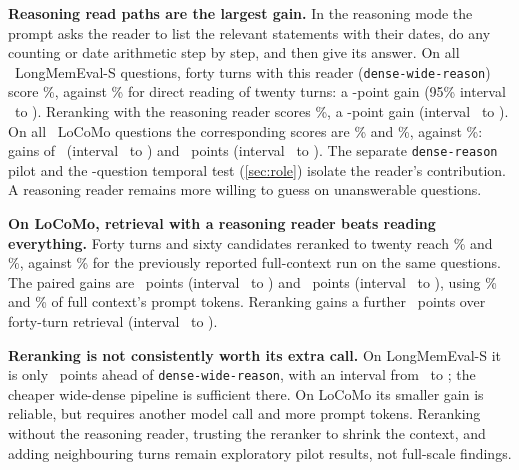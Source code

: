 \documentclass[11pt,letterpaper]{article}
\newcommand{\pipe}[1]{\texttt{#1}}
\begin{document}
\textbf{Reasoning read paths are the largest gain.} In the reasoning mode the prompt asks the reader to list the relevant statements with their dates, do any counting or date arithmetic step by step, and then give its answer. On all \numFullLmeQuestions\ LongMemEval-S questions, forty turns with this reader (\pipe{dense-wide-reason}) score \numFullLmeDenseWideReasonJudged\%, against \numFullLmeRawDenseJudged\% for direct reading of twenty turns: a \numFullLmeDenseWideReasonVsDense-point gain (95\% interval \numFullLmeDenseWideReasonVsDenseLow\ to \numFullLmeDenseWideReasonVsDenseHigh). Reranking with the reasoning reader scores \numFullLmeRerankReasonJudged\%, a \numFullLmeRerankReasonVsDense-point gain (interval \numFullLmeRerankReasonVsDenseLow\ to \numFullLmeRerankReasonVsDenseHigh). On all \numFullReadQuestions\ LoCoMo questions the corresponding scores are \numFullReadDenseWideReasonJudged\% and \numFullReadRerankReasonJudged\%, against \numFullReadRawDenseJudged\%: gains of \numFullReadDenseWideReasonVsDense\ (interval \numFullReadDenseWideReasonVsDenseLow\ to \numFullReadDenseWideReasonVsDenseHigh) and \numFullReadRerankReasonVsDense\ points (interval \numFullReadRerankReasonVsDenseLow\ to \numFullReadRerankReasonVsDenseHigh). The separate \pipe{dense-reason} pilot and the \numRoleQuestions-question temporal test (\cref{sec:role}) isolate the reader's contribution. A reasoning reader remains more willing to guess on unanswerable questions.

{\sloppy\textbf{On LoCoMo, retrieval with a reasoning reader beats reading everything.} Forty turns and sixty candidates reranked to twenty reach \numFullReadDenseWideReasonJudged\% and \numFullReadRerankReasonJudged\%, against \numLocomoFullContextJudged\% for the previously reported full-context run on the same questions. The paired gains are \numFullReadWideReasonVsFull\ points (interval \numFullReadWideReasonVsFullLow\ to \numFullReadWideReasonVsFullHigh) and \numFullReadRerankReasonVsFull\ points (interval \numFullReadRerankReasonVsFullLow\ to \numFullReadRerankReasonVsFullHigh), using \numFullReadWideReasonTokenShare\% and \numFullReadRerankReasonTokenShare\% of full context's prompt tokens. Reranking gains a further \numFullReadRerankReasonVsWide\ points over forty-turn retrieval (interval \numFullReadRerankReasonVsWideLow\ to \numFullReadRerankReasonVsWideHigh).\par}

\textbf{Reranking is not consistently worth its extra call.} On LongMemEval-S it is only \numFullLmeRerankReasonVsWide\ points ahead of \pipe{dense-wide-reason}, with an interval from \numFullLmeRerankReasonVsWideLow\ to \numFullLmeRerankReasonVsWideHigh; the cheaper wide-dense pipeline is sufficient there. On LoCoMo its smaller gain is reliable, but requires another model call and more prompt tokens. Reranking without the reasoning reader, trusting the reranker to shrink the context, and adding neighbouring turns remain exploratory pilot results, not full-scale findings.
\end{document}
